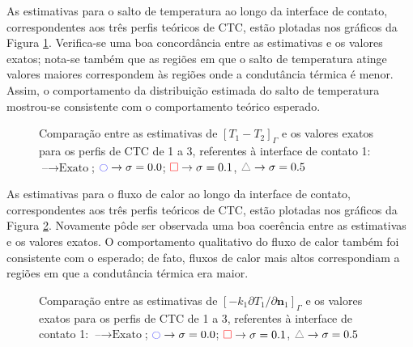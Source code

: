 As estimativas para o salto de temperatura ao longo da interface de contato, correspondentes aos três perfis teóricos de CTC, estão plotadas nos gráficos da Figura \ref{figura_delta_temperaturas_interface_01}. Verifica-se uma boa concordância entre as estimativas e os valores exatos; nota-se também que as regiões em que o salto de temperatura atinge valores maiores correspondem às regiões onde a condutância térmica é menor. Assim, o comportamento da distribuição estimada do salto de temperatura mostrou-se consistente com o comportamento teórico esperado.
\begin{figure}[h!b]
	\caption{Comparação entre as estimativas de $[T_1 - T_2]_\Gamma$ e os valores exatos para os perfis de CTC de 1 a 3, referentes à interface de contato 1: $\text{--} \rightarrow \text{Exato}$; $\textcolor{blue}{\ocircle} \rightarrow \sigma = 0.0$; $\textcolor{red}{\square} \rightarrow \sigma = 0.1$, $\textcolor{gray}{\triangle} \rightarrow \sigma = 0.5$}
	\label{figura_delta_temperaturas_interface_01}
\end{figure}

As estimativas para o fluxo de calor ao longo da interface de contato, correspondentes aos três perfis teóricos de CTC, estão plotadas nos gráficos da Figura \ref{figura_fluxo_calor_interface_01}. Novamente pôde ser observada uma boa coerência entre as estimativas e os valores exatos. O comportamento qualitativo do fluxo de calor também foi consistente com o esperado; de fato, fluxos de calor mais altos correspondiam a regiões em que a condutância térmica era maior.
\newpage
 
\begin{figure}[h!b]
	\caption{Comparação entre as estimativas de $[-k_1 {\partial T_1}/{\partial\mathbf{n}_1}]_\Gamma$ e os valores exatos para os perfis de CTC de 1 a 3, referentes à interface de contato 1: $\text{--} \rightarrow \text{Exato}$; $\textcolor{blue}{\ocircle} \rightarrow \sigma = 0.0$; $\textcolor{red}{\square} \rightarrow \sigma = 0.1$, $\textcolor{gray}{\triangle} \rightarrow \sigma = 0.5$}
	\label{figura_fluxo_calor_interface_01}
\end{figure}


